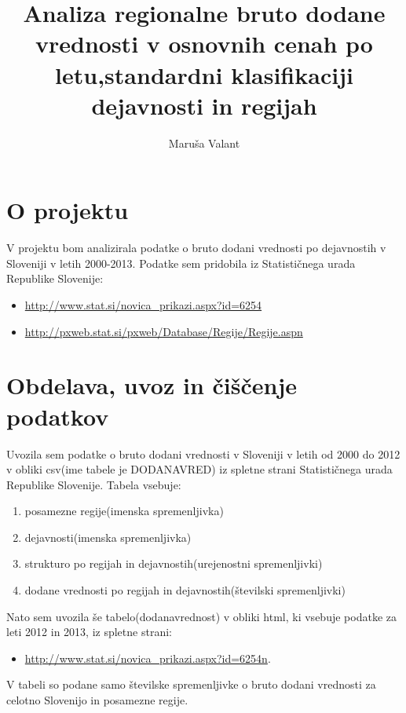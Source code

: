 \documentclass[a4paper, 11pt]{article}
\begin{document}
\author{Maruša Valant}
\title{Analiza regionalne bruto 
dodane vrednosti v osnovnih cenah 
po letu,standardni klasifikaciji 
dejavnosti in regijah} 
\maketitle

\section{O projektu}
V projektu bom analizirala podatke o bruto dodani vrednosti po dejavnostih v Sloveniji v letih 2000-2013. Podatke sem pridobila iz Statističnega urada Republike Slovenije:

\begin{itemize}

\item{\url{http://www.stat.si/novica_prikazi.aspx?id=6254}}
\item{\url{http://pxweb.stat.si/pxweb/Database/Regije/Regije.aspn}}

\end{itemize}

\section{Obdelava, uvoz in čiščenje podatkov}

Uvozila sem podatke o bruto dodani vrednosti v Sloveniji v letih od 2000 do 2012 v obliki csv(ime tabele je DODANAVRED) iz spletne strani Statističnega urada Republike Slovenije. Tabela vsebuje:

\begin{enumerate}
\item{posamezne regije(imenska spremenljivka)}
\item{dejavnosti(imenska spremenljivka)}
\item{strukturo po regijah in dejavnostih(urejenostni spremenljivki)}
\item{dodane vrednosti po regijah in dejavnostih(številski spremenljivki)}

\end{enumerate}

Nato sem uvozila še tabelo(dodanavrednost) v obliki html, ki vsebuje podatke za leti 2012 in 2013, iz spletne strani: 
\begin{itemize}
\item{\url{http://www.stat.si/novica_prikazi.aspx?id=6254n}}.
\end{itemize}
V tabeli so podane samo številske spremenljivke o bruto dodani vrednosti za celotno Slovenijo in posamezne regije.
\end{document}
